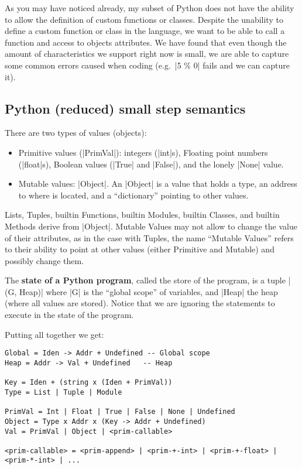 {}

As you may have noticed already, my subset of Python does not have the
ability to allow the definition of custom functions or classes. Despite
the unability to define a custom function or class in the language, we
want to be able to call a function and access to objects attributes. We
have found that even though the amount of characteristics we support
right now is small, we are able to capture some common errors caused
when coding (e.g.~\pycode|5 \% 0| fails and we can capture it).

\subsection{Python (reduced) small step semantics}
\label{python-reduced-small-step-semantics}

There are two types of values (objects):

\begin{itemize}
\tightlist
\item
  Primitive values (\pycode|PrimVal|): integers (\pycode|int|s),
  Floating point numbers (\pycode|float|s), Boolean values
  (\pycode|True| and \pycode|False|), and the lonely \pycode|None|
  value.
\item
  Mutable values: \pycode|Object|. An \pycode|Object| is a value that
  holds a type, an address to where is located, and a
  \enquote{dictionary} pointing to other values.
\end{itemize}

Lists, Tuples, builtin Functions, builtin Modules, builtin Classes, and
builtin Methods derive from \pycode|Object|. Mutable Values may not
allow to change the value of their attributes, as in the case with
Tuples, the name \enquote{Mutable Values} refers to their ability to
point at other values (either Primitive and Mutable) and possibly change
them.

The \textbf{state of a Python program}, called the store of the program,
is a tuple \pycode|(G, Heap)| where \pycode|G| is the \enquote{global
scope} of variables, and \pycode|Heap| the heap (where all values are
stored). Notice that we are ignoring the statements to execute in the
state of the program.

Putting all together we get:

\begin{verbatim}
Global = Iden -> Addr + Undefined -- Global scope
Heap = Addr -> Val + Undefined   -- Heap

Key = Iden + (string x (Iden + PrimVal))
Type = List | Tuple | Module

PrimVal = Int | Float | True | False | None | Undefined
Object = Type x Addr x (Key -> Addr + Undefined)
Val = PrimVal | Object | <prim-callable>

<prim-callable> = <prim-append> | <prim-+-int> | <prim-+-float> | <prim-*-int> | ...
\end{verbatim}

